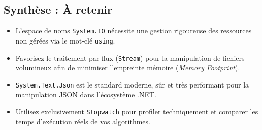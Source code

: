 \subsection*{Synthèse : À retenir}
\begin{itemize}
    \item L'espace de noms \texttt{System.IO} nécessite une gestion rigoureuse des ressources non gérées via le mot-clé \texttt{using}.
    \item Favorisez le traitement par flux (\texttt{Stream}) pour la manipulation de fichiers volumineux afin de minimiser l'empreinte mémoire (\textit{Memory Footprint}).
    \item \texttt{System.Text.Json} est le standard moderne, sûr et très performant pour la manipulation JSON dans l'écosystème .NET.
    \item Utilisez exclusivement \texttt{Stopwatch} pour profiler techniquement et comparer les temps d'exécution réels de vos algorithmes.
\end{itemize}
